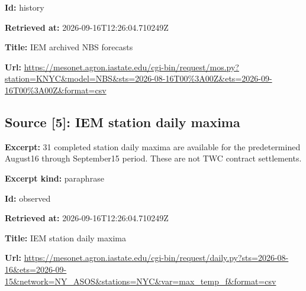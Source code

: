 \documentclass[11pt]{article}
\begin{document}
\par\noindent\textbf{Id:} history

\par\noindent\textbf{Retrieved at:} 2026-09-16T12:26:04.710249Z

\par\noindent\textbf{Title:} IEM archived NBS forecasts

\par\noindent\textbf{Url:} \href{https://mesonet.agron.iastate.edu/cgi-bin/request/mos.py?station=KNYC\&model=NBS\&sts=2026-08-16T00\%3A00Z\&ets=2026-09-16T00\%3A00Z\&format=csv}{https://meso\hspace{0pt}net.agron.ia\hspace{0pt}state.edu/cg\hspace{0pt}i-bin/reques\hspace{0pt}t/mos.py?sta\hspace{0pt}tion=KNYC\&mo\hspace{0pt}del=NBS\&sts=\hspace{0pt}2026-08-16T0\hspace{0pt}0\%3A00Z\&ets=\hspace{0pt}2026-09-16T0\hspace{0pt}0\%3A00Z\&form\hspace{0pt}at=csv}

\subsection*{\textcolor{epdarkgreen}{Source [5]: IEM station daily maxima}}
\par\noindent\textbf{Excerpt:} 31 completed station daily maxima are available for the predetermined August16 through September15 period. These are not TWC contract settlements.

\par\noindent\textbf{Excerpt kind:} paraphrase

\par\noindent\textbf{Id:} observed

\par\noindent\textbf{Retrieved at:} 2026-09-16T12:26:04.710249Z

\par\noindent\textbf{Title:} IEM station daily maxima

\par\noindent\textbf{Url:} \href{https://mesonet.agron.iastate.edu/cgi-bin/request/daily.py?sts=2026-08-16\&ets=2026-09-15\&network=NY\_ASOS\&stations=NYC\&var=max\_temp\_f\&format=csv}{https://meso\hspace{0pt}net.agron.ia\hspace{0pt}state.edu/cg\hspace{0pt}i-bin/reques\hspace{0pt}t/daily.py?s\hspace{0pt}ts=2026-08-1\hspace{0pt}6\&ets=2026-0\hspace{0pt}9-15\&network\hspace{0pt}=NY\_ASOS\&sta\hspace{0pt}tions=NYC\&va\hspace{0pt}r=max\_temp\_f\hspace{0pt}\&format=csv}
\end{document}
